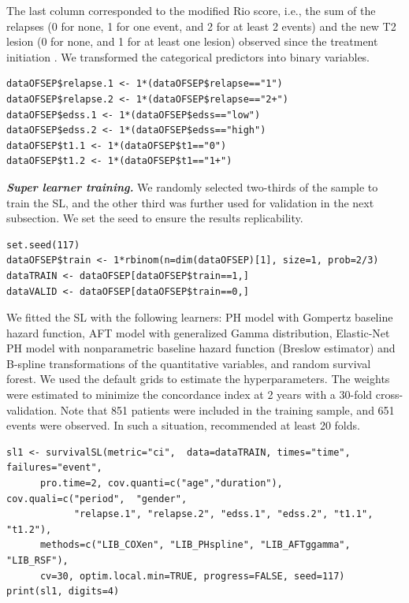 The last column corresponded to the modified Rio score, i.e., the sum of the relapses (0 for none, 1 for one event, and 2 for at least 2 events) and the new T2 lesion (0 for none, and 1 for at least one lesion) observed since the treatment initiation \citep{sormaniScoringTreatmentResponse2013a}. We transformed the categorical predictors into binary variables.

\begin{verbatim}
dataOFSEP$relapse.1 <- 1*(dataOFSEP$relapse=="1")
dataOFSEP$relapse.2 <- 1*(dataOFSEP$relapse=="2+")
dataOFSEP$edss.1 <- 1*(dataOFSEP$edss=="low")
dataOFSEP$edss.2 <- 1*(dataOFSEP$edss=="high")
dataOFSEP$t1.1 <- 1*(dataOFSEP$t1=="0")
dataOFSEP$t1.2 <- 1*(dataOFSEP$t1=="1+")
\end{verbatim}

\textbf{\textit{Super learner training.}} We randomly selected two-thirds of the sample to train the SL, and the other third was further used for validation in the next subsection. We set the seed to ensure the results replicability.

\begin{verbatim}
set.seed(117)
dataOFSEP$train <- 1*rbinom(n=dim(dataOFSEP)[1], size=1, prob=2/3)
dataTRAIN <- dataOFSEP[dataOFSEP$train==1,]
dataVALID <- dataOFSEP[dataOFSEP$train==0,]
\end{verbatim}

We fitted the SL with the following learners: PH model with Gompertz baseline hazard function, AFT model with generalized Gamma distribution, Elastic-Net PH model with nonparametric baseline hazard function (Breslow estimator) and B-spline transformations of the quantitative variables, and random survival forest. We used the default grids to estimate the hyperparameters. The weights were estimated to minimize the concordance index at 2 years with a 30-fold cross-validation. Note that 851 patients were included in the training sample, and 651 events were observed. In such a situation, \citet{phillips_practical_2023} recommended at least 20 folds.

\begin{verbatim}
sl1 <- survivalSL(metric="ci",  data=dataTRAIN, times="time", failures="event",
      pro.time=2, cov.quanti=c("age","duration"), cov.quali=c("period",  "gender",
            "relapse.1", "relapse.2", "edss.1", "edss.2", "t1.1", "t1.2"),
      methods=c("LIB_COXen", "LIB_PHspline", "LIB_AFTggamma", "LIB_RSF"),
      cv=30, optim.local.min=TRUE, progress=FALSE, seed=117)
print(sl1, digits=4)
\end{verbatim}

